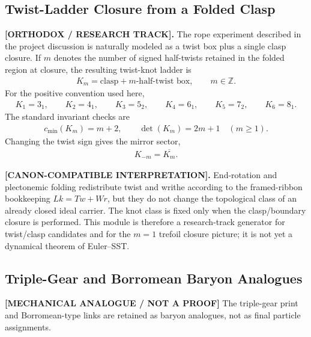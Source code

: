 \subsection{Twist-Ladder Closure from a Folded Clasp}
\label{subsec:rt_twist_ladder_closure}

\textbf{[ORTHODOX / RESEARCH TRACK].}
The rope experiment described in the project discussion is naturally modeled as
a twist box plus a single clasp closure. If \(m\) denotes the number of signed
half-twists retained in the folded region at closure, the resulting twist-knot
ladder is
\begin{align}
    K_m
    =
    \text{clasp}+\text{\(m\)-half-twist box},
    \qquad
    m\in\mathbb{Z}.
    \label{eq:rt_twist_ladder_Km}
\end{align}
For the positive convention used here,
\begin{align}
    K_1=3_1,\qquad
    K_2=4_1,\qquad
    K_3=5_2,\qquad
    K_4=6_1,\qquad
    K_5=7_2,\qquad
    K_6=8_1 .
    \label{eq:rt_twist_ladder_first_terms}
\end{align}
The standard invariant checks are
\begin{align}
    c_{\min}(K_m)=m+2,
    \qquad
    \det(K_m)=2m+1
    \quad (m\ge 1).
    \label{eq:rt_twist_ladder_invariants}
\end{align}
Changing the twist sign gives the mirror sector,
\begin{align}
    K_{-m}=\overline{K_m}.
    \label{eq:rt_twist_ladder_mirror}
\end{align}

\textbf{[CANON-COMPATIBLE INTERPRETATION].}
End-rotation and plectonemic folding redistribute twist and writhe according
to the framed-ribbon bookkeeping \(Lk=Tw+Wr\), but they do not change the
topological class of an already closed ideal carrier. The knot class is fixed
only when the clasp/boundary closure is performed. This module is therefore a
research-track generator for twist/clasp candidates and for the \(m=1\) trefoil
closure picture; it is not yet a dynamical theorem of Euler--SST.

\subsection{Triple-Gear and Borromean Baryon Analogues}
\label{subsec:rt_triple_gear_borromean_baryons}

\textbf{[MECHANICAL ANALOGUE / NOT A PROOF]} The triple-gear print and Borromean-type links are retained as baryon analogues, not as final particle assignments.

